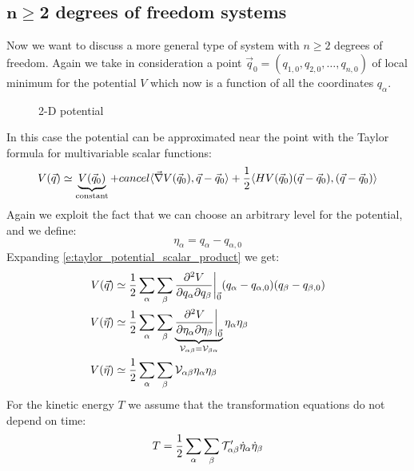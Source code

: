 \subsection{$\mathbf{n\geq 2}$ degrees of freedom systems}
Now we want to discuss a more general type of system with $n\geq2$ degrees of freedom. Again we take in consideration a point $\vec{q}_0 = (q_{1,0}, q_{2,0},\dots,q_{n,0})$ of local minimum for the potential $V$ which now is a function of all the coordinates $q_{\alpha}$.
\begin{figure}[!ht]
    \centering
    
    \caption{2-D potential}
    \label{fig:image11}
\end{figure}
In this case the potential can be approximated near the point with the Taylor formula for multivariable scalar functions:
\begin{equation} \label{e:taylor_potential_scalar_product}
    V(\vec{q}) \simeq \underbrace{V(\vec{q}_0)}_{\text{constant}} + \\cancel{\langle \vec{\nabla} V(\vec{q}_0), \vec{q}-\vec{q}_0\rangle} + \dfrac{1}{2}\langle H V(\vec{q}_0)(\vec{q}-\vec{q}_0), (\vec{q}-\vec{q}_0)\rangle
\end{equation}
Again we exploit the fact that we can choose an arbitrary level for the potential, and we define:
\begin{equation}
    \eta_{\alpha} = q_{\alpha} - q_{\alpha,0}
\end{equation}
Expanding \eqref{e:taylor_potential_scalar_product} we get:
\begin{equation}
    \begin{split}
        V(\vec{q}) &\simeq \dfrac{1}{2}\displaystyle\sum_{\alpha}\displaystyle\sum_{\beta}\dfrac{\partial^2 V}{\partial q_{\alpha} \partial q_{\beta}}\bigg|_{\vec{0}}(q_{\alpha} - q_{\alpha,0})(q_{\beta} - q_{\beta,0})\\
        V(\vec{\eta}) &\simeq \dfrac{1}{2}\displaystyle\sum_{\alpha}\displaystyle\sum_{\beta}\underbrace{\dfrac{\partial^2 V}{\partial \eta_{\alpha} \partial \eta_{\beta}}\bigg|_{\vec{0}}}_{\mathcal{V}_{\alpha \beta} = \mathcal{V}_{\beta \alpha}}\eta_{\alpha}\eta_{\beta}\\
        V(\vec{\eta}) &\simeq \dfrac{1}{2}\displaystyle\sum_{\alpha}\displaystyle\sum_{\beta}\mathcal{V}_{\alpha \beta}\eta_{\alpha}\eta_{\beta}
    \end{split}
\end{equation}
For the kinetic energy $T$ we assume that the transformation equations do not depend on time:
\begin{equation}
    T = \dfrac{1}{2}\displaystyle\sum_{\alpha}\displaystyle\sum_{\beta}\mathcal{T}'_{\alpha \beta} \dot{\eta}_{\alpha}\dot{\eta}_{\beta}
\end{equation}
